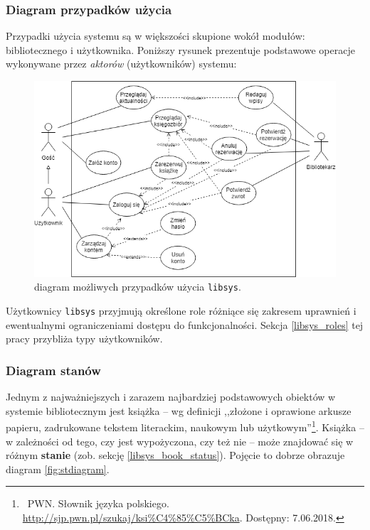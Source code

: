 \documentclass[12pt, a4paper]{article}
\begin{document}
\subsubsection{Diagram przypadków użycia}
Przypadki użycia systemu są w większości skupione wokół modułów: bibliotecznego i użytkownika. Poniższy rysunek prezentuje podstawowe operacje wykonywane przez \textit{aktorów} (użytkowników) systemu:

\begin{figure}[h]
    \centering
    \includegraphics[width=\textwidth]{img/diagram_use_cases.png}
    \caption{diagram możliwych przypadków użycia \texttt{libsys}.}
    \label{fig:ucdiagram}
\end{figure}

Użytkownicy \texttt{libsys} przyjmują określone role różniące się zakresem uprawnień i ewentualnymi ograniczeniami dostępu do funkcjonalności. Sekcja \ref{libsys_roles} tej pracy przybliża typy użytkowników.

\subsubsection{Diagram stanów}
Jednym z najważniejszych i zarazem najbardziej podstawowych obiektów w systemie bibliotecznym jest książka -- wg definicji ,,złożone i oprawione arkusze papieru, zadrukowane tekstem literackim, naukowym lub użytkowym''\footnote{\ PWN. Słownik języka polskiego. \url{http://sjp.pwn.pl/szukaj/ksi\%C4\%85\%C5\%BCka}. Dostępny: 7.06.2018.}. Książka -- w zależności od tego, czy jest wypożyczona, czy też nie -- może znajdować się w różnym \textbf{stanie} (zob. sekcję \ref{libsys_book_status}). Pojęcie to dobrze obrazuje diagram \ref{fig:stdiagram}.
\end{document}
